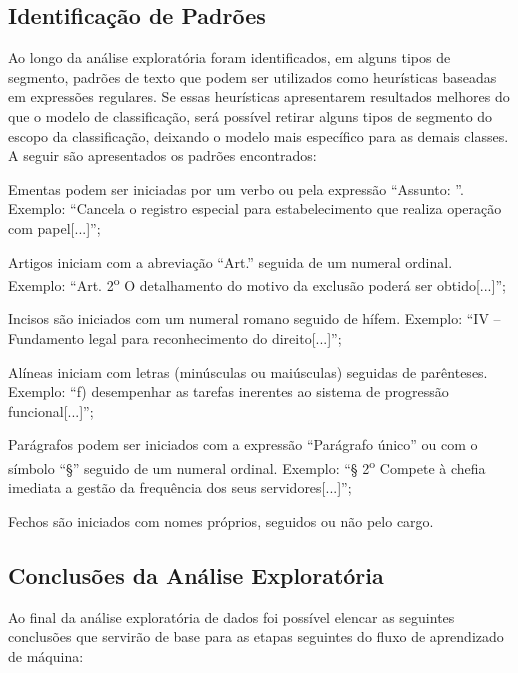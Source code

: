 \subsection{Identificação de Padrões}

Ao longo da análise exploratória foram identificados, em alguns tipos de segmento, padrões de texto  que podem ser utilizados como heurísticas baseadas em expressões regulares. Se essas heurísticas apresentarem resultados melhores do que o modelo de classificação, será possível retirar alguns tipos de segmento do escopo da classificação, deixando o modelo mais específico para as demais classes. A seguir são apresentados os padrões encontrados:

\begin{alineas}
	\item Ementas podem ser iniciadas por um verbo ou pela expressão ``Assunto: ''. Exemplo: ``Cancela o registro especial para estabelecimento que realiza operação com papel[...]'';
	\item Artigos iniciam com a abreviação ``Art.'' seguida de um numeral ordinal. Exemplo: ``Art. 2\textsuperscript{o} O detalhamento do motivo da exclusão poderá ser obtido[...]'';
	\item Incisos são iniciados com um numeral romano seguido de hífem. Exemplo: ``IV – Fundamento legal para reconhecimento do direito[...]'';
	\item Alíneas iniciam com letras (minúsculas ou maiúsculas) seguidas de parênteses. Exemplo: ``f) desempenhar as tarefas inerentes ao sistema de progressão funcional[...]'';
	\item Parágrafos podem ser iniciados com a expressão ``Parágrafo único'' ou com o símbolo ``§'' seguido de um numeral ordinal. Exemplo: ``§ 2\textsuperscript{o} Compete à chefia imediata a gestão da frequência dos seus servidores[...]'';
	\item Fechos são iniciados com nomes próprios, seguidos ou não pelo cargo.
\end{alineas}

 \subsection{Conclusões da Análise Exploratória}
 
 Ao final da análise exploratória de dados foi possível elencar as seguintes conclusões que servirão de base para as etapas seguintes do fluxo de aprendizado de máquina:

